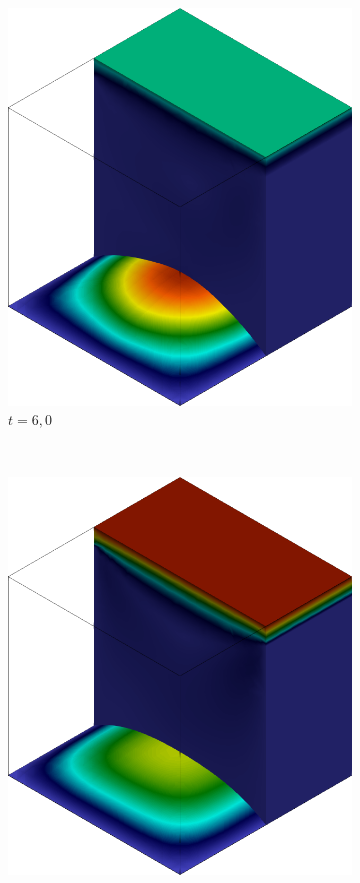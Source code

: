 \begin{figure}[h!]
\begin{subfigure}[b]{0.35\textwidth}
        \includegraphics[width=\linewidth]{Figuras/FSI-Cavity3D/u6.png}
        \caption{$t=6,0$}
    \end{subfigure}\\
    \begin{subfigure}[b]{0.35\textwidth}
        \includegraphics[width=\linewidth]{Figuras/FSI-Cavity3D/u21-8.png}

\end{subfigure}
\end{figure}

